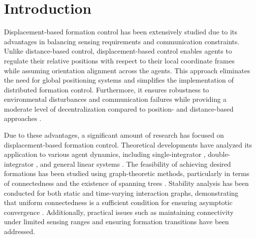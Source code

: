 \documentclass{ifacconf}
\begin{document}
\section{Introduction}



Displacement-based formation control has been extensively studied due to its advantages in balancing sensing requirements and communication constraints. Unlike distance-based control, displacement-based control enables agents to regulate their relative positions with respect to their local coordinate frames while assuming orientation alignment across the agents. This approach eliminates the need for global positioning systems and simplifies the implementation of distributed formation control. Furthermore, it ensures robustness to environmental disturbances and communication failures while providing a moderate level of decentralization compared to position- and distance-based approaches \citep{oh2015survey}.

Due to these advantages, a significant amount of research has focused on displacement-based formation control. Theoretical developments have analyzed its application to various agent dynamics, including single-integrator \citep{jadbabaie2003coordination, ren2005consensus}, double-integrator \citep{ren2007distributed}, and general linear systems \citep{fax2004information}. The feasibility of achieving desired formations has been studied using graph-theoretic methods, particularly in terms of connectedness and the existence of spanning trees \citep{ren2005consensus}. Stability analysis has been conducted for both static and time-varying interaction graphs, demonstrating that uniform connectedness is a sufficient condition for ensuring asymptotic convergence \citep{moreau2005stability, lin2007state}. Additionally, practical issues such as maintaining connectivity under limited sensing ranges \citep{ji2007distributed} and ensuring formation transitions \citep{ren2007distributed} have been addressed.
\end{document}
